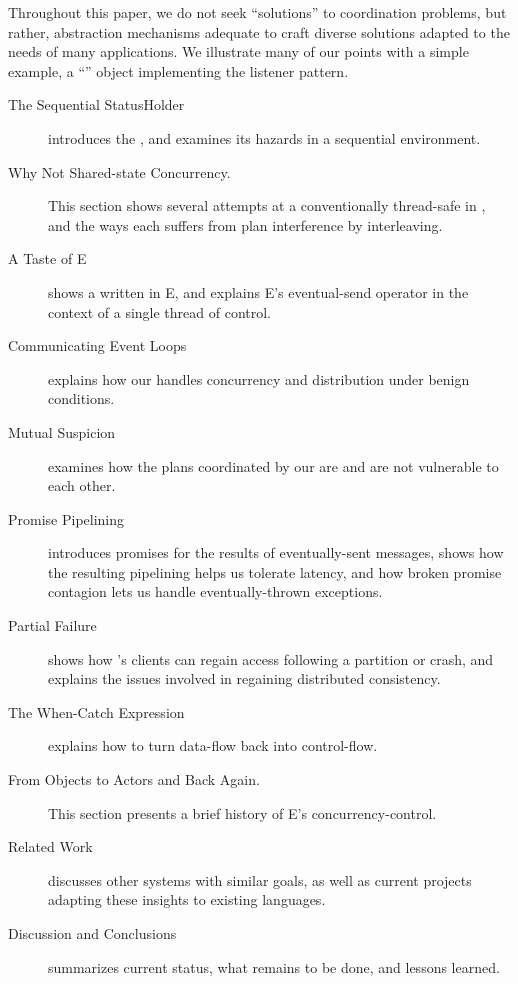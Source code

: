\documentclass{llncs}
\begin{document}
Throughout this paper, we do not seek ``solutions'' to coordination
problems, but rather, abstraction mechanisms adequate to craft diverse
solutions adapted to the needs of many applications. We illustrate
many of our points with a simple example, a ``''
object implementing the listener pattern.
%
\begin{description}
\item[The Sequential StatusHolder] introduces the ,
and examines its hazards in a sequential environment.

\item[Why Not Shared-state Concurrency.] This section shows several
attempts at a conventionally thread-safe  in
, and the ways each suffers from plan interference by
interleaving.

\item[A Taste of E] shows a  written in E, and explains
E's eventual-send operator in the context of a single thread of
control.

\item[Communicating Event Loops] explains how our 
handles concurrency and distribution under benign conditions.

\item[Mutual Suspicion] examines how the plans coordinated by our
 are and are not vulnerable to each other.

\item[Promise Pipelining] introduces promises for the results of
eventually-sent messages, shows how the resulting pipelining helps us
tolerate latency, and how broken promise contagion lets us handle
eventually-thrown exceptions.

\item[Partial Failure] shows how 's clients can
regain access following a partition or crash, and explains the issues
involved in regaining distributed consistency.

\item[The When-Catch Expression] explains how to turn data-flow back
into control-flow.

\item[From Objects to Actors and Back Again.] This section presents a
brief history of E's concurrency-control.

\item[Related Work] discusses other systems with similar goals, as
well as current projects adapting these insights to existing
languages.

\item[Discussion and Conclusions] summarizes current status, what
remains to be done, and lessons learned. 

\end{description}
\end{document}
